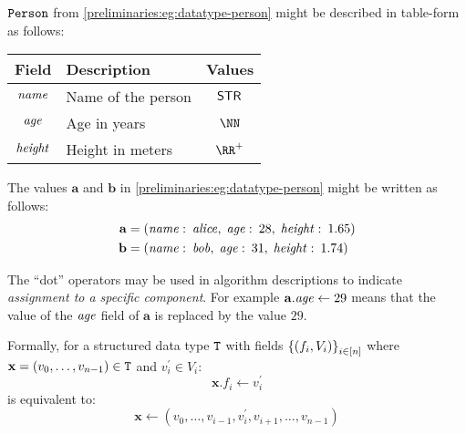 \begin{example}\label{preliminaries:eg:datatype-person-table}
  ${\mathtt{Person}}$ from \cref{preliminaries:eg:datatype-person} might be described in table-form as follows:
  \begin{table}[H]
    \centering
    \begin{tabular}{cp{20em}c}
      Field                & Description        & Values \\ \toprule
      $\mathit{name}$   & Name of the person & $\mathsf{STR}{}$ \\ \midrule
      $\mathit{age}$    & Age in years       & $\NN$ \\ \midrule
      $\mathit{height}$ & Height in meters   & $\RR^+$ \\ \midrule
    \end{tabular}
  \end{table}
\end{example}

\begin{example}\label{preliminaries:eg:datatype-person-value-with-field-names}
  The values $\mathbf{a}$ and $\mathbf{b}$ in \cref{preliminaries:eg:datatype-person} might be written as follows:
  \begin{align*}
    \mathbf{a} &=
    (\mathit{name}:\: \mathit{alice}, \; \mathit{age}:\: 28, \; \mathit{height}:\: 1.65) \\
    \mathbf{b} &=
    (\mathit{name}:\: \mathit{bob}, \; \mathit{age}:\: 31, \; \mathit{height}:\: 1.74)
  \end{align*}
\end{example}

\begin{remark}\label{preliminaries:rem:dot-assignment}
  The ``dot'' operators may be used in algorithm descriptions to indicate \emph{assignment to a specific component}. For example $\mathbf{a}.\mathit{age} \gets 29$ means that the value of the $\mathit{age}$ field of $\mathbf{a}$ is replaced by the value $29$.

  Formally, for a structured data type ${\mathtt{T}}$ with fields $\left\{{(f_i, V_i)}\right\}_{i \in [n]}$ where $\mathbf{x} = (v_0, \ldots, v_{n-1}) \in {\mathtt{T}}$ and $v_i^\prime \in V_i$:
  \[
    \mathbf{x}.f_i \gets v_i^\prime
  \]
  is equivalent to:
  \[
    \mathbf{x} \gets (v_0, \ldots, v_{i-1}, v_i^\prime, v_{i+1}, \ldots, v_{n-1})
  \]
\end{remark}

